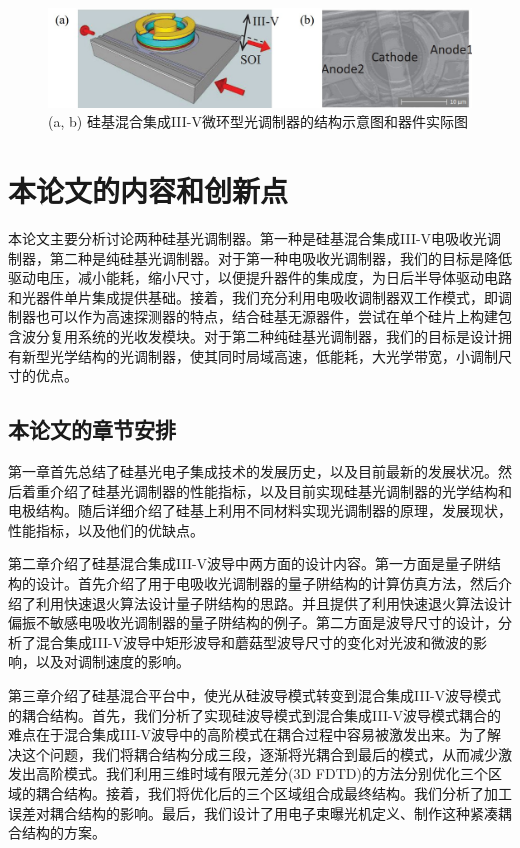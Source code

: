 \begin{figure}[htb]
	\centering
	\includegraphics[width=12cm]{./Pictures/fig_eam_ring.jpg}
	\caption{ (a, b) 硅基混合集成III-V微环型光调制器的结构示意图和器件实际图\cite{Srinivasan2012micro}}
	\label{fig_eam_ring}
\end{figure}

\section{本论文的内容和创新点}
本论文主要分析讨论两种硅基光调制器。第一种是硅基混合集成III-V电吸收光调制器，第二种是纯硅基光调制器。对于第一种电吸收光调制器，我们的目标是降低驱动电压，减小能耗，缩小尺寸，以便提升器件的集成度，为日后半导体驱动电路和光器件单片集成提供基础。接着，我们充分利用电吸收调制器双工作模式，即调制器也可以作为高速探测器的特点，结合硅基无源器件，尝试在单个硅片上构建包含波分复用系统的光收发模块。对于第二种纯硅基光调制器，我们的目标是设计拥有新型光学结构的光调制器，使其同时局域高速，低能耗，大光学带宽，小调制尺寸的优点。

\subsection{本论文的章节安排}
第一章首先总结了硅基光电子集成技术的发展历史，以及目前最新的发展状况。然后着重介绍了硅基光调制器的性能指标，以及目前实现硅基光调制器的光学结构和电极结构。随后详细介绍了硅基上利用不同材料实现光调制器的原理，发展现状，性能指标，以及他们的优缺点。

第二章介绍了硅基混合集成III-V波导中两方面的设计内容。第一方面是量子阱结构的设计。首先介绍了用于电吸收光调制器的量子阱结构的计算仿真方法，然后介绍了利用快速退火算法设计量子阱结构的思路。并且提供了利用快速退火算法设计偏振不敏感电吸收光调制器的量子阱结构的例子。第二方面是波导尺寸的设计，分析了混合集成III-V波导中矩形波导和蘑菇型波导尺寸的变化对光波和微波的影响，以及对调制速度的影响。

第三章介绍了硅基混合平台中，使光从硅波导模式转变到混合集成III-V波导模式的耦合结构。首先，我们分析了实现硅波导模式到混合集成III-V波导模式耦合的难点在于混合集成III-V波导中的高阶模式在耦合过程中容易被激发出来。为了解决这个问题，我们将耦合结构分成三段，逐渐将光耦合到最后的模式，从而减少激发出高阶模式。我们利用三维时域有限元差分(3D FDTD)的方法分别优化三个区域的耦合结构。接着，我们将优化后的三个区域组合成最终结构。我们分析了加工误差对耦合结构的影响。最后，我们设计了用电子束曝光机定义、制作这种紧凑耦合结构的方案。

